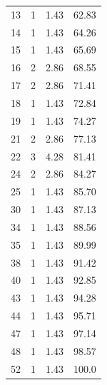 \documentclass{article}
\begin{document}
\begin{longtable}{|c|c|c|c|}
    13              & 1                  & 1.43                & 62.83                          \\
    14              & 1                  & 1.43                & 64.26                          \\
    15              & 1                  & 1.43                & 65.69                          \\
    16              & 2                  & 2.86                & 68.55                          \\
    17              & 2                  & 2.86                & 71.41                          \\
    18              & 1                  & 1.43                & 72.84                          \\
    19              & 1                  & 1.43                & 74.27                          \\
    21              & 2                  & 2.86                & 77.13                          \\
    22              & 3                  & 4.28                & 81.41                          \\
    24              & 2                  & 2.86                & 84.27                          \\
    25              & 1                  & 1.43                & 85.70                          \\
    30              & 1                  & 1.43                & 87.13                          \\
    34              & 1                  & 1.43                & 88.56                          \\
    35              & 1                  & 1.43                & 89.99                          \\
    38              & 1                  & 1.43                & 91.42                          \\
    40              & 1                  & 1.43                & 92.85                          \\
    43              & 1                  & 1.43                & 94.28                          \\
    44              & 1                  & 1.43                & 95.71                          \\
    47              & 1                  & 1.43                & 97.14                          \\
    48              & 1                  & 1.43                & 98.57                          \\
    52              & 1                  & 1.43                & 100.0                          \\
\end{longtable}
\restoregeometry
\end{document}
